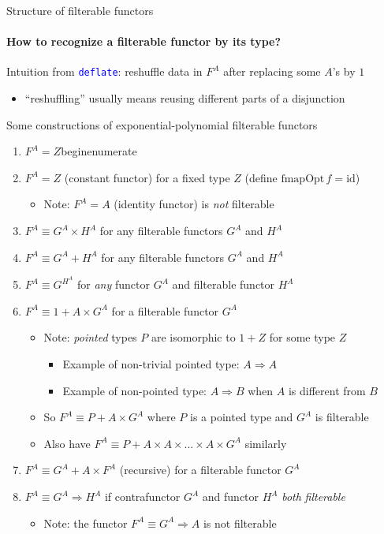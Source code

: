 \documentclass[english]{beamer}
\begin{document}
\begin{frame}{Structure of filterable functors}


\framesubtitle{How to recognize a filterable functor by its type?}

Intuition from \texttt{\textcolor{blue}{\footnotesize{}deflate}}:
reshuffle data in $F^{A}$ after replacing some $A$'s by $1$
\begin{itemize}
\item ``reshuffling'' usually means reusing different parts of a disjunction
\end{itemize}
Some constructions of exponential-polynomial filterable functors 
\begin{enumerate}
\item $F^{A}=Z$begin{enumerate}
\item $F^{A}=Z$ (constant functor) for a fixed type $Z$ (define $\text{fmapOpt}\,f=\text{id}$)
\begin{itemize}
\item Note: $F^{A}=A$ (identity functor) is \emph{not} filterable
\end{itemize}
\item $F^{A}\equiv G^{A}\times H^{A}$ for any filterable functors $G^{A}$
and $H^{A}$
\item $F^{A}\equiv G^{A}+H^{A}$ for any filterable functors $G^{A}$ and
$H^{A}$
\item $F^{A}\equiv G^{H^{A}}$ for \emph{any} functor $G^{A}$ and filterable
functor $H^{A}$
\item $F^{A}\equiv1+A\times G^{A}$ for a filterable functor $G^{A}$
\begin{itemize}
\item Note: \emph{pointed} types $P$ are isomorphic to $1+Z$ for some
type $Z$
\begin{itemize}
\item Example of non-trivial pointed type: $A\Rightarrow A$
\item Example of non-pointed type: $A\Rightarrow B$ when $A$ is different
from $B$
\end{itemize}
\item So $F^{A}\equiv P+A\times G^{A}$ where $P$ is a pointed type and
$G^{A}$ is filterable
\item Also have $F^{A}\equiv P+A\times A\times...\times A\times G^{A}$
similarly
\end{itemize}
\item $F^{A}\equiv G^{A}+A\times F^{A}$ (recursive) for a filterable functor
$G^{A}$
\item $F^{A}\equiv G^{A}\Rightarrow H^{A}$ if\emph{ }contrafunctor $G^{A}$
and functor $H^{A}$ \emph{both} \emph{filterable}
\begin{itemize}
\item Note: the functor $F^{A}\equiv G^{A}\Rightarrow A$ is not filterable
\end{itemize}
\end{enumerate}
\end{frame}
\end{document}

